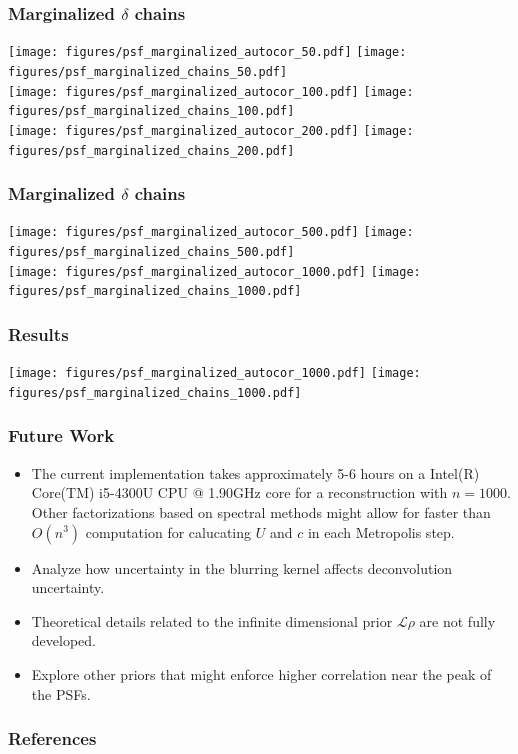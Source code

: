 \documentclass[]{beamer}
\begin{document}
\begin{frame}[t]
  \frametitle{Marginalized $\delta$ chains}
  \vspace{-1.2em}
  \begin{center}
    \texttt{[image: figures/psf\_marginalized\_autocor\_50.pdf]}  \texttt{[image: figures/psf\_marginalized\_chains\_50.pdf]}\\
    \texttt{[image: figures/psf\_marginalized\_autocor\_100.pdf]} \texttt{[image: figures/psf\_marginalized\_chains\_100.pdf]}\\
    \texttt{[image: figures/psf\_marginalized\_autocor\_200.pdf]} \texttt{[image: figures/psf\_marginalized\_chains\_200.pdf]}\\
  \end{center}
\end{frame}
\begin{frame}[t]
  \frametitle{Marginalized $\delta$ chains}
  \begin{center}
    \texttt{[image: figures/psf\_marginalized\_autocor\_500.pdf]} \texttt{[image: figures/psf\_marginalized\_chains\_500.pdf]}\\ 
    \texttt{[image: figures/psf\_marginalized\_autocor\_1000.pdf]} \texttt{[image: figures/psf\_marginalized\_chains\_1000.pdf]}\\ 
  \end{center}
\end{frame} 

\begin{frame}[t]
  \frametitle{Results}

    \texttt{[image: figures/psf\_marginalized\_autocor\_1000.pdf]} \texttt{[image: figures/psf\_marginalized\_chains\_1000.pdf]}\\ 
\end{frame}

\begin{frame}[t]
  \frametitle{Future Work}
  {\footnotesize
  \begin{itemize}
  \itemsep 1.2em
    \item The current implementation takes approximately \alert{5-6 hours} on a Intel(R) Core(TM) i5-4300U CPU @ 1.90GHz core for a reconstruction with $n=1000$. Other factorizations based on spectral methods might allow for faster than $O(n^3)$ computation for calucating $U$ and $c$ in each Metropolis step.
    \item Analyze how uncertainty in the blurring kernel affects \alert{deconvolution uncertainty}.
    \item Theoretical details related to the \alert{infinite dimensional prior $\mathcal L \rho$} are not fully developed.
    \item Explore \alert{other priors} that might enforce higher correlation near the peak of the PSFs.
  \end{itemize}
  }
\end{frame}

\begin{frame}
  \frametitle{References}
  
  {\footnotesize
  
  }
\end{frame}
\end{document}
